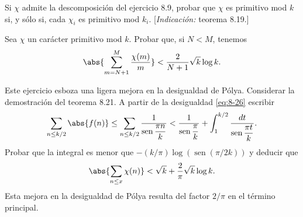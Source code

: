 \documentclass[12pt,a4paper]{book}
\begin{document}
    \begin{ejercicio}
        Si $\chi$ admite la descomposición del ejercicio 8.9, probar que $\chi$ es
        primitivo mod $k$ si, y sólo si, cada $\chi_{i}$ es primitivo mod $k_{i}$.
        [\textit{Indicación:} teorema 8.19.]
    \end{ejercicio}

    \begin{ejercicio}
        Sea $\chi$ un carácter primitivo mod $k$. Probar que, si $N<M$, tenemos
        \begin{equation*}
            \abs{\sum_{m=N+1}^{M}\frac{\chi(m)}{m}}<\frac{2}{N+1}\sqrt{k}\log k.
        \end{equation*}
    \end{ejercicio}

    \begin{ejercicio}
        Este ejercicio esboza una ligera mejora en la desigualdad de Pólya. Considerar la
        demostración del teorema 8.21. A partir de la desigualdad \eqref{eq:8-26} escribir
        \begin{equation*}
            \sum_{n\leq k/2}\abs{f(n)}\leq\sum_{n\leq k/2}\frac{1}{\operatorname{sen}\dfrac{\pi n}{k}}
            <\frac{1}{\operatorname{sen}\dfrac{\pi}{k}}+\int_{1}^{k/2}\frac{dt}{\operatorname{sen}\dfrac{\pi t}{k}}.
        \end{equation*}
        Probar que la integral es menor que $-(k/\pi)\log(\operatorname{sen}(\pi/2k))$ y
        deducir que
        \begin{equation*}
            \abs{\sum_{n\leq x}\chi(n)}<\sqrt{k}+\frac{2}{\pi}\sqrt{k}\log k.
        \end{equation*}
        Esta mejora en la desigualdad de Pólya resulta del factor $2/\pi$ en el término
        principal.
    \end{ejercicio}
\end{document}
